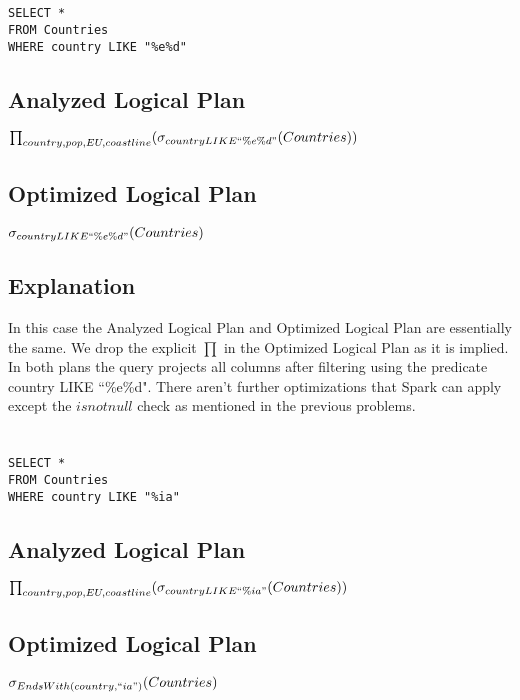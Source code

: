 \documentclass[12pt]{article}
\begin{document}
\newpage

\section{}
\begin{verbatim}
SELECT *
FROM Countries
WHERE country LIKE "%e%d"
\end{verbatim}

\subsection*{Analyzed Logical Plan}
$\prod_{country, pop, EU, coastline}(\sigma_{country LIKE ``\%e\%d"}(Countries))$

\subsection*{Optimized Logical Plan}
$\sigma_{country LIKE ``\%e\%d"}(Countries)$

\subsection*{Explanation}

In this case the Analyzed Logical Plan and Optimized Logical Plan are essentially the same. We drop the explicit $\prod$ in the Optimized Logical Plan as it is implied. In both plans the query projects all columns after filtering using the predicate country LIKE ``\%e\%d". There aren't further optimizations that Spark can apply except the $isnotnull$ check as mentioned in the previous problems.
\newpage

\section{}
\begin{verbatim}
SELECT *
FROM Countries
WHERE country LIKE "%ia"
\end{verbatim}

\subsection*{Analyzed Logical Plan}
$\prod_{country, pop, EU, coastline}(\sigma_{country LIKE ``\%ia"}(Countries))$


\subsection*{Optimized Logical Plan}
$\sigma_{EndsWith(country, ``ia")}(Countries)$
\end{document}
